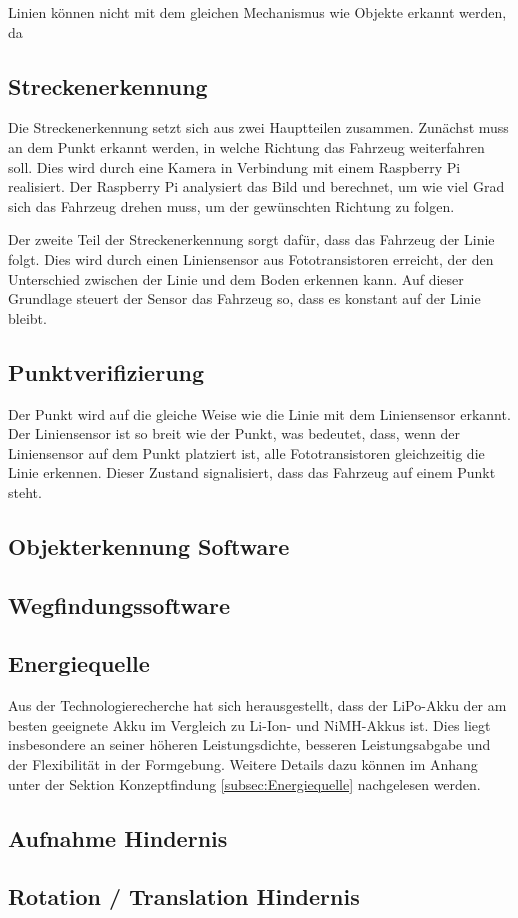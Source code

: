 \documentclass[../main.tex]{subfiles}
\begin{document}
Linien können nicht mit dem gleichen Mechanismus wie Objekte erkannt werden, da 


\subsection{Streckenerkennung}
Die Streckenerkennung setzt sich aus zwei Hauptteilen zusammen. Zunächst muss an dem Punkt erkannt werden, in welche Richtung das Fahrzeug weiterfahren soll. Dies wird durch eine Kamera in Verbindung mit einem Raspberry Pi realisiert. Der Raspberry Pi analysiert das Bild und berechnet, um wie viel Grad sich das Fahrzeug drehen muss, um der gewünschten Richtung zu folgen.

Der zweite Teil der Streckenerkennung sorgt dafür, dass das Fahrzeug der Linie folgt. Dies wird durch einen Liniensensor aus Fototransistoren erreicht, der den Unterschied zwischen der Linie und dem Boden erkennen kann. Auf dieser Grundlage steuert der Sensor das Fahrzeug so, dass es konstant auf der Linie bleibt.


\subsection{Punktverifizierung}
Der Punkt wird auf die gleiche Weise wie die Linie mit dem Liniensensor erkannt. Der Liniensensor ist so breit wie der Punkt, was bedeutet, dass, wenn der Liniensensor auf dem Punkt platziert ist, alle Fototransistoren gleichzeitig die Linie erkennen. Dieser Zustand signalisiert, dass das Fahrzeug auf einem Punkt steht.


\subsection{Objekterkennung Software}



\subsection{Wegfindungssoftware}


\subsection{Energiequelle}
Aus der Technologierecherche hat sich herausgestellt, dass der LiPo-Akku der am besten geeignete Akku im Vergleich zu Li-Ion- und NiMH-Akkus ist. Dies liegt insbesondere an seiner höheren Leistungsdichte, besseren Leistungsabgabe und der Flexibilität in der Formgebung. Weitere Details dazu können im Anhang unter der Sektion Konzeptfindung \ref{subsec:Energiequelle} nachgelesen werden.

\subsection{Aufnahme Hindernis}



\subsection{Rotation / Translation Hindernis}
\end{document}
